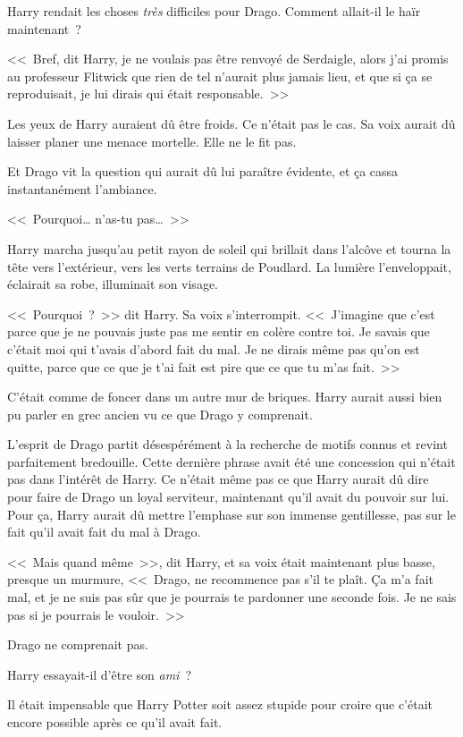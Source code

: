 Harry rendait les choses \emph{très} difficiles pour Drago. Comment allait-il le haïr maintenant~?

<<~Bref, dit Harry, je ne voulais pas être renvoyé de Serdaigle, alors j'ai promis au professeur Flitwick que rien de tel n'aurait plus jamais lieu, et que si ça se reproduisait, je lui dirais qui était responsable.~>>

Les yeux de Harry auraient dû être froids. Ce n'était pas le cas. Sa voix aurait dû laisser planer une menace mortelle. Elle ne le fit pas.

Et Drago vit la question qui aurait dû lui paraître évidente, et ça cassa instantanément l'ambiance.

<<~Pourquoi… n'as-tu pas…~>>

Harry marcha jusqu'au petit rayon de soleil qui brillait dans l'alcôve et tourna la tête vers l'extérieur, vers les verts terrains de Poudlard. La lumière l'enveloppait, éclairait sa robe, illuminait son visage.

<<~Pourquoi~?~>> dit Harry. Sa voix s'interrompit. <<~J'imagine que c'est parce que je ne pouvais juste pas me sentir en colère contre toi. Je savais que c'était moi qui t'avais d'abord fait du mal. Je ne dirais même pas qu'on est quitte, parce que ce que je t'ai fait est pire que ce que tu m'as fait.~>>

C'était comme de foncer dans un autre mur de briques. Harry aurait aussi bien pu parler en grec ancien vu ce que Drago y comprenait.

L'esprit de Drago partit désespérément à la recherche de motifs connus et revint parfaitement bredouille. Cette dernière phrase avait été une concession qui n'était pas dans l'intérêt de Harry. Ce n'était même pas ce que Harry aurait dû dire pour faire de Drago un loyal serviteur, maintenant qu'il avait du pouvoir sur lui. Pour ça, Harry aurait dû mettre l'emphase sur son immense gentillesse, pas sur le fait qu'il avait fait du mal à Drago.

<<~Mais quand même~>>, dit Harry, et sa voix était maintenant plus basse, presque un murmure, <<~Drago, ne recommence pas s'il te plaît. Ça m'a fait mal, et je ne suis pas sûr que je pourrais te pardonner une seconde fois. Je ne sais pas si je pourrais le vouloir.~>>

Drago ne comprenait pas.

Harry essayait-il d'être son \emph{ami}~?

Il était impensable que Harry Potter soit assez stupide pour croire que c'était encore possible après ce qu'il avait fait.

